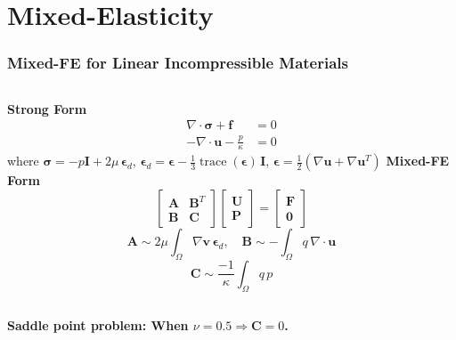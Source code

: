 \documentclass[aspectratio=169,xcolor=dvipsnames]{beamer}
\newcommand{\bm}{\boldsymbol}
\begin{document}
\section{Mixed-Elasticity}
\begin{frame}
\frametitle{Mixed-FE for Linear Incompressible Materials}
\begin{columns}
        {\Large
        \textbf{Strong Form}
        \begin{align}
            \nabla\cdot \bm{\sigma} + \bm{f} &= 0 \nonumber \\
            -\nabla\cdot\bm u -\frac{p}{\kappa} &=0 \nonumber
        \end{align}
        }
        where $\bm{\sigma} = -p \bm{I} + 2\mu \, \bm{\epsilon}_d$, $\bm{\epsilon}_d = \bm{\epsilon} - \frac{1}{3} \operatorname{trace} \left(\bm{\epsilon}\right) \, \bm{I}$, $ \bm{\epsilon} = \frac{1}{2} \left(\nabla\bm u +  \nabla\bm u ^T \right) $
        {\Large
        \textbf{Mixed-FE Form}
        \begin{equation} \nonumber
        \begin{bmatrix}
        \bm{A} & \bm{B}^T \\
        \bm{B} & \bm{C}
        \end{bmatrix}
        \begin{bmatrix}
        \bm{U}\\
        \bm{P}
        \end{bmatrix}
        = \begin{bmatrix}
        \bm{F}\\
        \bm{0}
        \end{bmatrix}
        \end{equation}
        }
        \begin{equation}
            \bm{A} \sim 2\mu \int_\Omega \nabla\bm{v}\,\bm{\epsilon}_d, \quad \bm{B} \sim -\int_\Omega q \, \nabla\cdot\bm{u} \nonumber 
        \end{equation}
        \begin{equation}
        \bm{C} \sim \frac{-1}{\kappa} \int_\Omega q \, p \nonumber 
        \end{equation}
    \end{columns}

\vspace*{20pt}

\textbf{Saddle point problem: When $\nu = 0.5 \Longrightarrow \bm{C} = 0 $.}

\end{frame}
\end{document}
